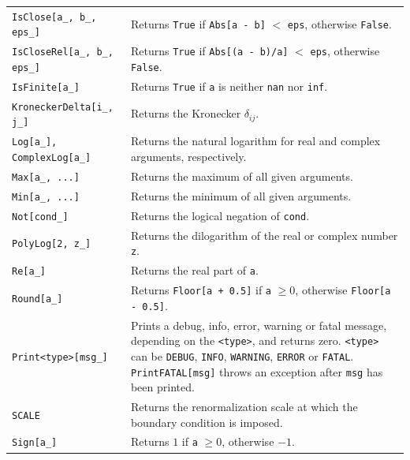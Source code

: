 \documentclass[final,3p,11pt,pdflatex]{elsarticle}
\newcommand{\code}[1]{\lstinline|#1|}  %
\begin{document}
\begin{table}[h!]
{\begin{tabularx}{1.05\textwidth}{lX}
    \code{IsClose[a_, b_, eps_]} &
    Returns \code{True} if \code{Abs[a - b]} $<$ \code{eps}, otherwise \code{False}. \\

    \code{IsCloseRel[a_, b_, eps_]} &
    Returns \code{True} if \code{Abs[(a - b)/a]} $<$ \code{eps}, otherwise \code{False}. \\

    \code{IsFinite[a_]} &
    Returns \code{True} if \code{a} is neither \code{nan} nor \code{inf}. \\

    \code{KroneckerDelta[i_, j_]} &
    Returns the Kronecker $\delta_{ij}$. \\

    \code{Log[a_], ComplexLog[a_]} &
    Returns the natural logarithm for real and complex arguments, respectively. \\

    \code{Max[a_, ...]} &
    Returns the maximum of all given arguments. \\

    \code{Min[a_, ...]} &
    Returns the minimum of all given arguments. \\

    \code{Not[cond_]} &
    Returns the logical negation of \code{cond}. \\

    \code{PolyLog[2, z_]} &
    Returns the dilogarithm of the real or complex number \code{z}. \\

    \code{Re[a_]} &
    Returns the real part of \code{a}. \\

    \code{Round[a_]} &
    Returns \code{Floor[a + 0.5]} if \code{a} $\geq 0$, otherwise
    \code{Floor[a - 0.5]}. \\

    \code{Print<type>[msg_]} & Prints a debug, info, error, warning or
    fatal message, depending on the \code{<type>}, and returns zero.
    \code{<type>} can be \code{DEBUG}, \code{INFO}, \code{WARNING},
    \code{ERROR} or \code{FATAL}.  \code{PrintFATAL[msg]}
    throws an exception after \code{msg} has been printed.\\

    \code{SCALE} & Returns the renormalization scale at which
    the boundary condition is imposed. \\

    \code{Sign[a_]} &
    Returns $1$ if \code{a} $\geq 0$, otherwise $-1$. \\


\end{tabularx}}
\end{table}
\end{document}
